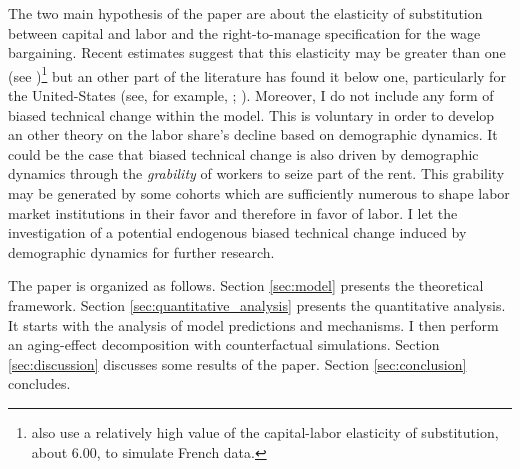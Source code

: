 The two main hypothesis of the paper are about the elasticity of substitution between capital and labor and the right-to-manage specification for the wage bargaining. Recent estimates suggest that this elasticity may be greater than one (see \citealt{Karabarbounis2014})\footnote{\cite{Caballero1998} also use a relatively high value of the capital-labor elasticity of substitution, about 6.00, to simulate French data.} but an other part of the literature has found it below one, particularly for the United-States (see, for example, \citealt{Antras2004}; \citealt{Chirinko2008}). Moreover, I do not include any form of biased technical change within the model. This is voluntary in order to develop an other theory on the labor share's decline based on demographic dynamics. It could be the case that biased technical change is also driven by demographic dynamics through the \textit{grability} of workers to seize part of the rent. This grability may be generated by some cohorts which are sufficiently numerous to shape labor market institutions in their favor and therefore in favor of labor. I let the investigation of a potential endogenous biased technical change induced by demographic dynamics for further research.


The paper is organized as follows. Section \ref{sec:model} presents the theoretical framework. Section \ref{sec:quantitative_analysis} presents the quantitative analysis. It starts with the analysis of model predictions and mechanisms. I then perform an aging-effect decomposition with counterfactual simulations. Section \ref{sec:discussion} discusses some results of the paper. Section \ref{sec:conclusion} concludes.








